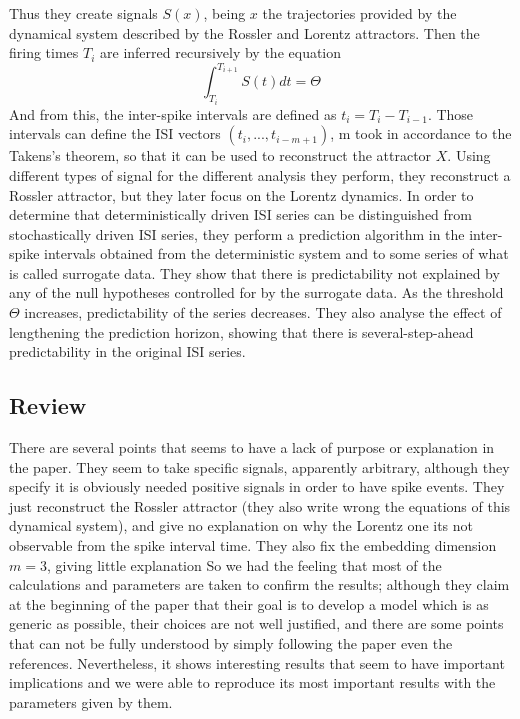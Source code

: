 \documentclass[10pt]{article}
\begin{document}
Thus they create signals $S(x)$, being $x$ the trajectories provided by the dynamical system described by the Rossler and Lorentz attractors. Then the firing times $T_i$ are inferred recursively by the equation
\begin{equation}
\int_{T_i}^{T_{i+1}} S(t)dt=\Theta
\end{equation}
And from this, the inter-spike intervals are defined as $t_i = T_i - T_{i-1}$. Those intervals can define the ISI vectors $(t_i,...,t_{i-m+1})$, m took in accordance to the Takens's theorem, so that it can be used to reconstruct the attractor $X$. Using different types of signal for the different analysis they perform, they reconstruct a Rossler attractor, but they later focus on the Lorentz dynamics. In order to determine that deterministically driven ISI series can be distinguished from stochastically driven ISI series, they perform a prediction algorithm in the inter-spike intervals obtained from the deterministic system and to some series of what is called surrogate data. They show that there is predictability not explained by any of the null hypotheses controlled for by the surrogate data. As the threshold $\Theta$ increases, predictability of the series decreases. They also analyse the effect of lengthening the prediction horizon, showing that there is several-step-ahead predictability in the original ISI series.

\subsection{Review}
There are several points that seems to have a lack of purpose or explanation in the paper. They seem to take specific signals, apparently arbitrary, although they specify it is obviously needed positive signals in order to have spike events. They just reconstruct the Rossler attractor (they also write wrong the equations of this dynamical system), and give no explanation on why the Lorentz one its not observable from the spike interval time. They also fix the embedding dimension $m=3$, giving little explanation So we had the feeling that most of the calculations and parameters are taken to confirm the results; although they claim at the beginning of the paper that their goal is to develop a model which is as generic as possible, their choices are not well justified, and there are some points that can not be fully understood by simply following the paper even the references. Nevertheless, it shows interesting results that seem to have important implications and we were able to reproduce its most important results with the parameters given by them.
\end{document}
